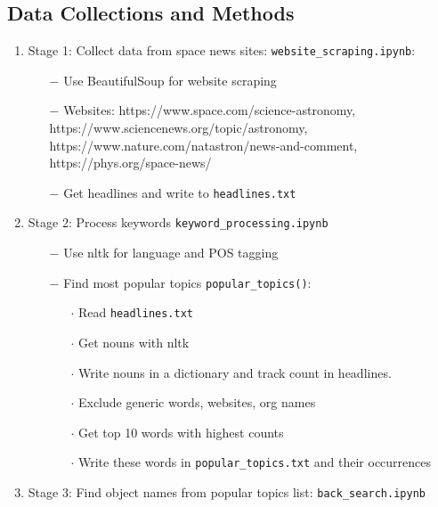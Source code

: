 \documentclass[12pt,letterpaper]{article}
\begin{document}
\subsection*{Data Collections and Methods}
\begin{enumerate}[leftmargin=*]
    \item Stage 1: Collect data from space news sites:  \texttt{website\_scraping.ipynb}:
        \begin{enumerate}
            \item [$-$] Use BeautifulSoup for website scraping
            \item [$-$] Websites: https://www.space.com/science-astronomy, \\
            https://www.sciencenews.org/topic/astronomy, \\ 
            https://www.nature.com/natastron/news-and-comment, \\ 
            https://phys.org/space-news/
            \item [$-$] Get headlines and write to \texttt{headlines.txt}
        \end{enumerate}
    \item Stage 2: Process keywords \texttt{keyword\_processing.ipynb}
        \begin{enumerate}
            \item [$-$] Use nltk for language and POS tagging
            \item [$-$] Find most popular topics \texttt{popular\_topics()}:
            \begin{enumerate}[leftmargin=*]
                \item[$\cdot$] Read \texttt{headlines.txt}
                \item[$\cdot$]Get nouns with nltk
                \item[$\cdot$]Write nouns in a dictionary and track count in headlines.
                \item[$\cdot$]Exclude generic words, websites, org names
                \item[$\cdot$]Get top 10 words with highest counts
                \item[$\cdot$]Write these words in \texttt{popular\_topics.txt} and 
                  their occurrences
            \end{enumerate}
        \end{enumerate}
    \item Stage 3: Find object names from popular topics list:
    \texttt{back\_search.ipynb}

\end{enumerate}
\end{document}

